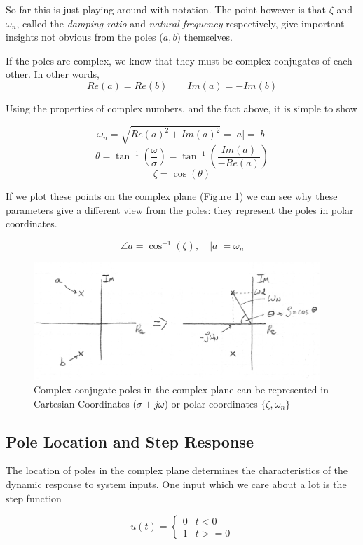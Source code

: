 So far this is just playing around with notation.  The point  however is that $\zeta$ and $\omega_n$, called the {\it damping ratio} and {\it natural frequency} respectively, give important insights not obvious from the poles ($a,b$) themselves.

If the poles are complex, we know that they must  be complex conjugates of each other. In other words,
\[
Re(a) = Re(b) \qquad Im(a) = -Im(b)
\]

Using the properties of complex numbers, and the fact above, it is simple to show

\[
\omega_n = \sqrt{Re(a)^2 + Im(a)^2} = |a| = |b|
\]
\[
\theta = \tan^{-1}\left(\frac{\omega}{\sigma}\right)= \tan^{-1}\left(\frac{Im(a)}{-Re(a)}\right)
\]
\[
\zeta = \cos(\theta)
\]

If we plot these points on the complex plane (Figure \ref{ccpoleszeta}) we can see why these parameters give a different view from the poles:
they represent the poles in polar coordinates.

\[ \angle a = \cos^{-1}(\zeta), \quad |a| = \omega_n
\]


\begin{figure}\centering
 \includegraphics[width=4.25in]{figs05/00733a.png}
\caption{Complex conjugate poles in the complex plane can be represented in Cartesian Coordinates
($\sigma+j\omega$) or polar coordinates $\{\zeta, \omega_n\}$}\label{ccpoleszeta}
\end{figure}

\subsection{Pole Location and Step Response}

The location of poles in the complex plane determines the characteristics of the dynamic response to system inputs.  One input which we care about a lot is the step function

\[
u(t) = \left \{ \begin{array}{cc} 0 & t< 0 \\ 1 & t >= 0 \end{array} \right .
\]

